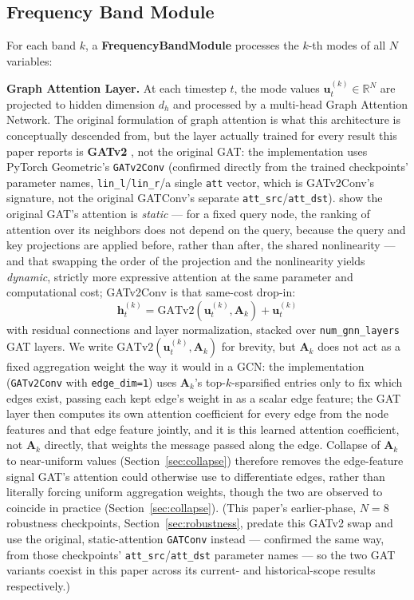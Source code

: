 \documentclass[journal]{IEEEtran}
\begin{document}
\subsection{Frequency Band Module}

For each band $k$, a \textbf{FrequencyBandModule} processes the $k$-th modes of all $N$ variables:

\textbf{Graph Attention Layer.} At each timestep $t$, the mode values $\mathbf{u}^{(k)}_t \in \mathbb{R}^{N}$ are projected to hidden dimension $d_h$ and processed by a multi-head Graph Attention Network. The original formulation of graph attention \citep{Velickovic2018} is what this architecture is conceptually descended from, but the layer actually trained for every result this paper reports is \textbf{GATv2} \citep{Brody2022}, not the original GAT: the implementation uses PyTorch Geometric's \texttt{GATv2Conv} (confirmed directly from the trained checkpoints' parameter names, \texttt{lin\_l}/\texttt{lin\_r}/a single \texttt{att} vector, which is GATv2Conv's signature, not the original GATConv's separate \texttt{att\_src}/\texttt{att\_dst}). \citet{Brody2022} show the original GAT's attention is \emph{static} --- for a fixed query node, the ranking of attention over its neighbors does not depend on the query, because the query and key projections are applied before, rather than after, the shared nonlinearity --- and that swapping the order of the projection and the nonlinearity yields \emph{dynamic}, strictly more expressive attention at the same parameter and computational cost; GATv2Conv is that same-cost drop-in:
\begin{equation}
\label{eq:gat}
\mathbf{h}^{(k)}_{t} = \text{GATv2}(\mathbf{u}^{(k)}_{t}, \mathbf{A}_k) + \mathbf{u}^{(k)}_{t}
\end{equation}
with residual connections and layer normalization, stacked over \texttt{num\_gnn\_layers} GAT layers. We write $\text{GATv2}(\mathbf{u}^{(k)}_t, \mathbf{A}_k)$ for brevity, but $\mathbf{A}_k$ does not act as a fixed aggregation weight the way it would in a GCN: the implementation (\texttt{GATv2Conv} with \texttt{edge\_dim=1}) uses $\mathbf{A}_k$'s top-$k$-sparsified entries only to fix which edges exist, passing each kept edge's weight in as a scalar edge feature; the GAT layer then computes its own attention coefficient for every edge from the node features and that edge feature jointly, and it is this learned attention coefficient, not $\mathbf{A}_k$ directly, that weights the message passed along the edge. Collapse of $\mathbf{A}_k$ to near-uniform values (Section~\ref{sec:collapse}) therefore removes the edge-feature signal GAT's attention could otherwise use to differentiate edges, rather than literally forcing uniform aggregation weights, though the two are observed to coincide in practice (Section~\ref{sec:collapse}). (This paper's earlier-phase, $N=8$ robustness checkpoints, Section~\ref{sec:robustness}, predate this GATv2 swap and use the original, static-attention \texttt{GATConv} instead --- confirmed the same way, from those checkpoints' \texttt{att\_src}/\texttt{att\_dst} parameter names --- so the two GAT variants coexist in this paper across its current- and historical-scope results respectively.)
\end{document}
